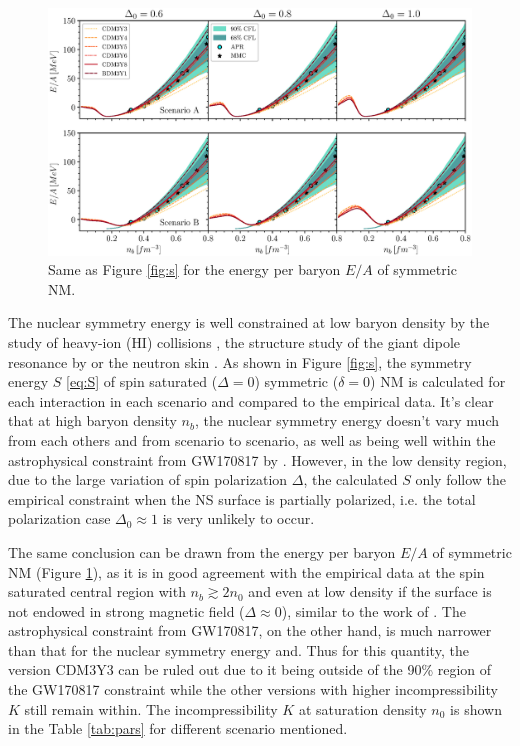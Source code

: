 \begin{figure}[ht!]
    \centering
    \includegraphics[width=\textwidth]{fig/EAS.eps}
    \caption{Same as Figure \ref{fig:s} for the energy per baryon $E/A$ of symmetric \gls{NM}.}
    \label{fig:eas}
\end{figure} 
The nuclear symmetry energy is well constrained at low baryon density by the study of heavy-ion (\gls{HI}) collisions \citep{tsang2011constraints,ono2003isospin}, the structure study of the giant dipole resonance by \cite{trippa2008giant} or the neutron skin \citep{furnstahl2002neutron}. As shown in Figure \ref{fig:s}, the symmetry energy $S$ \eqref{eq:S} of spin saturated ($\Delta = 0$) symmetric ($\delta = 0$) \gls{NM} is calculated for each interaction in each scenario and compared to the empirical data. It's clear that at high baryon density $n_b$, the nuclear symmetry energy doesn't vary much from each others and from scenario to scenario, as well as being well within the astrophysical constraint from GW170817 by \cite{xie2019bayesian}. However, in the low density region, due to the large variation of spin polarization $\Delta$, the calculated $S$ only follow the empirical constraint when the \gls{NS} surface is partially polarized, i.e. the total polarization case $\Delta_0 \approx 1$ is very unlikely to occur.\par
The same conclusion can be drawn from the energy per baryon $E/A$ of symmetric \gls{NM} (Figure \ref{fig:eas}), as it is in good agreement with the empirical data \citep{akmal1998equation,gandolfi2010microscopic} at the spin saturated central region with $n_b \gtrsim 2n_0$ and even at low density if the surface is not endowed in strong magnetic field ($\Delta\approx 0$), similar to the work of \cite{tan2021equation}. The astrophysical constraint from GW170817, on the other hand, is much narrower than that for the nuclear symmetry energy and. Thus for this quantity, the version CDM3Y3 can be ruled out due to it being outside of the 90\% region of the GW170817 constraint while the other versions with higher incompressibility $K$ still remain within. The incompressibility $K$ at saturation density $n_0$ is shown in the Table \ref{tab:pars} for different scenario mentioned.\par
